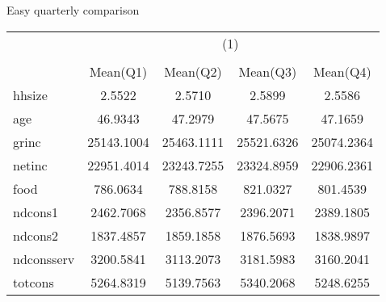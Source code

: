 {
\def\sym#1{\ifmmode^{#1}\else\(^{#1}\)\fi}
\caption{Easy quarterly comparison \label{compareQs}}
\begin{tabular}{l*{1}{cccc}}

\hline\hline
            &\multicolumn{4}{c}{(1)}                            \\
            &\multicolumn{4}{c}{}                               \\
            &    Mean(Q1)&    Mean(Q2)&    Mean(Q3)&    Mean(Q4)\\
\hline
hhsize      &      2.5522&      2.5710&      2.5899&      2.5586\\
age         &     46.9343&     47.2979&     47.5675&     47.1659\\
grinc       &  25143.1004&  25463.1111&  25521.6326&  25074.2364\\
netinc      &  22951.4014&  23243.7255&  23324.8959&  22906.2361\\
food        &    786.0634&    788.8158&    821.0327&    801.4539\\
ndcons1     &   2462.7068&   2356.8577&   2396.2071&   2389.1805\\
ndcons2     &   1837.4857&   1859.1858&   1876.5693&   1838.9897\\
ndconsserv  &   3200.5841&   3113.2073&   3181.5983&   3160.2041\\
totcons     &   5264.8319&   5139.7563&   5340.2068&   5248.6255\\
\hline\hline
\end{tabular}
}
